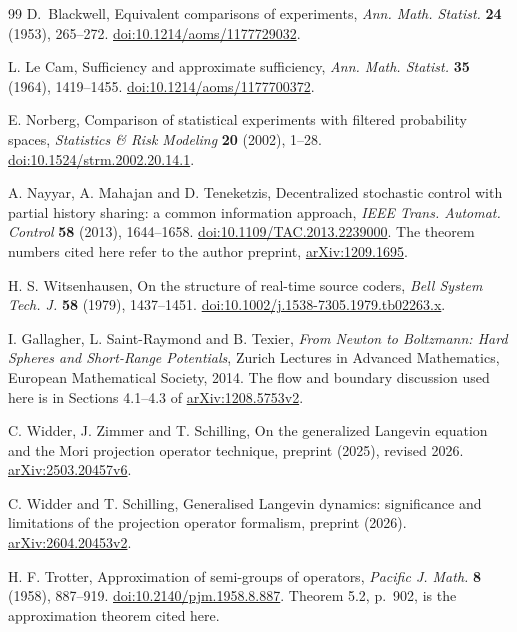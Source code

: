 \begin{thebibliography}{99}
D.~Blackwell, Equivalent comparisons of experiments,
\emph{Ann. Math. Statist.} \textbf{24} (1953), 265--272.
\href{https://doi.org/10.1214/aoms/1177729032}{doi:10.1214/aoms/1177729032}.

L. Le Cam, Sufficiency and approximate sufficiency,
\emph{Ann. Math. Statist.} \textbf{35} (1964), 1419--1455.
\href{https://doi.org/10.1214/aoms/1177700372}{doi:10.1214/aoms/1177700372}.

E. Norberg, Comparison of statistical experiments with filtered
probability spaces, \emph{Statistics \& Risk Modeling} \textbf{20}
(2002), 1--28.
\href{https://doi.org/10.1524/strm.2002.20.14.1}{doi:10.1524/strm.2002.20.14.1}.

A. Nayyar, A. Mahajan and D. Teneketzis,
Decentralized stochastic control with partial history sharing:
a common information approach,
\emph{IEEE Trans. Automat. Control} \textbf{58} (2013), 1644--1658.
\href{https://doi.org/10.1109/TAC.2013.2239000}{doi:10.1109/TAC.2013.2239000}.
The theorem numbers cited here refer to the author preprint,
\href{https://arxiv.org/abs/1209.1695}{arXiv:1209.1695}.

H. S. Witsenhausen, On the structure of real-time source coders,
\emph{Bell System Tech. J.} \textbf{58} (1979), 1437--1451.
\href{https://doi.org/10.1002/j.1538-7305.1979.tb02263.x}{doi:10.1002/j.1538-7305.1979.tb02263.x}.


I. Gallagher, L. Saint-Raymond and B. Texier,
\emph{From Newton to Boltzmann: Hard Spheres and Short-Range Potentials},
Zurich Lectures in Advanced Mathematics, European Mathematical Society, 2014.
The flow and boundary discussion used here is in Sections 4.1--4.3 of
\href{https://arxiv.org/abs/1208.5753v2}{arXiv:1208.5753v2}.

C. Widder, J. Zimmer and T. Schilling,
On the generalized Langevin equation and the Mori projection operator technique,
preprint (2025), revised 2026.
\href{https://arxiv.org/abs/2503.20457v6}{arXiv:2503.20457v6}.

C. Widder and T. Schilling,
Generalised Langevin dynamics: significance and limitations of the
projection operator formalism, preprint (2026).
\href{https://arxiv.org/abs/2604.20453v2}{arXiv:2604.20453v2}.

H. F. Trotter, Approximation of semi-groups of operators,
\emph{Pacific J. Math.} \textbf{8} (1958), 887--919.
\href{https://doi.org/10.2140/pjm.1958.8.887}{doi:10.2140/pjm.1958.8.887}.
Theorem 5.2, p.~902, is the approximation theorem cited here.


\end{thebibliography}
